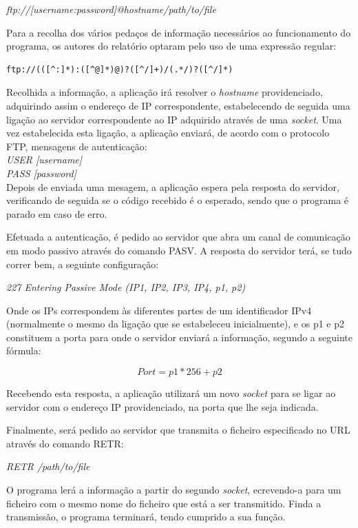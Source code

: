 \documentclass{article}
\begin{document}
\textit{ftp://[username:password]@hostname/path/to/file}

Para a recolha dos vários pedaços de informação necessários ao funcionamento do programa, os autores do relatório optaram pelo uso de uma expressão regular:

\begin{verbatim}
ftp://(([^:]*):([^@]*)@)?([^/]+)/(.*/)?([^/]*)
\end{verbatim}

Recolhida a informação, a aplicação irá resolver o \textit{hostname} providenciado, adquirindo assim o endereço de IP correspondente, estabelecendo de seguida uma ligação ao servidor correspondente ao IP adquirido através de uma \textit{socket}. Uma vez estabelecida esta ligação, a aplicação enviará, de acordo com o protocolo FTP, mensagens de autenticação:
\\
\textit{USER [username]}\\
\textit{PASS [password]}
\\
Depois de enviada uma mesagem, a aplicação espera pela resposta do servidor, verificando de seguida se o código recebido é o esperado, sendo que o programa é parado em caso de erro.

Efetuada a autenticação, é pedido ao servidor que abra um canal de comunicação em modo passivo através do comando PASV. A resposta do servidor terá, se tudo correr bem, a seguinte configuração:

\textit{227 Entering Passive Mode (IP1, IP2, IP3, IP4, p1, p2)}

Onde os IPs correspondem às diferentes partes de um identificador IPv4 (normalmente o mesmo da ligação que se estabeleceu inicialmente), e os p1 e p2 constituem a porta para onde o servidor enviará a informação, segundo a seguinte fórmula:

\begin{equation}
Port = p1*256 + p2
\end{equation}

Recebendo esta resposta, a aplicação utilizará um novo \textit{socket} para se ligar ao servidor com o endereço IP providenciado, na porta que lhe seja indicada.

Finalmente, será pedido ao servidor que transmita o ficheiro especificado no URL através do comando RETR:

\textit{RETR /path/to/file}

O programa lerá a informação a partir do segundo \textit{socket}, ecrevendo-a para um ficheiro com o mesmo nome do ficheiro que está a ser transmitido. Finda a transmissão, o programa terminará, tendo cumprido a sua função.
\end{document}
